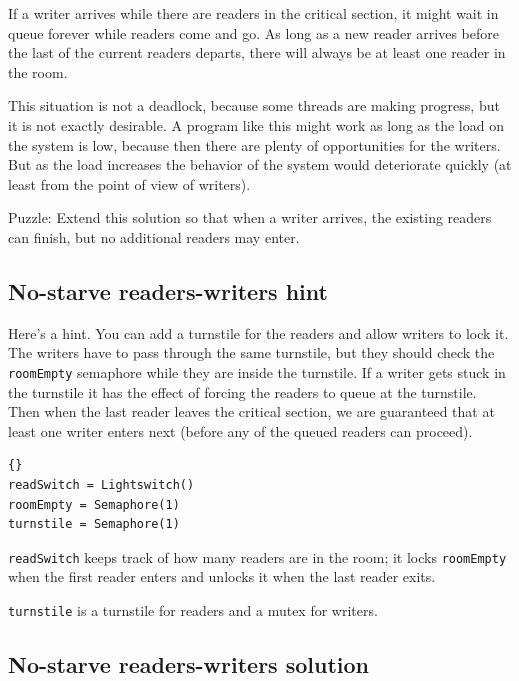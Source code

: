\documentclass{book}
\newcommand{\clearemptydoublepage}{\newpage\cleardoublepage}
\begin{document}
If a writer arrives while there are readers in the critical section,
it might wait in queue forever while readers come and go.  As long
as a new reader arrives before the last of the current readers
departs, there will always be at least one reader in the room.

This situation is not a deadlock, because some threads are making
progress, but it is not exactly desirable.  A program like this
might work as long as the load on the system is low, because then there
are plenty of opportunities for the writers.  But as the load
increases the behavior of the system would deteriorate quickly
(at least from the point of view of writers).

Puzzle: Extend this solution so that when a writer arrives,
the existing readers can finish, but no additional readers
may enter.


\clearemptydoublepage
\subsection {No-starve readers-writers hint}  

Here's a hint.  You can add a turnstile for the readers and
allow writers to lock it.  The writers have to pass through
the same turnstile, but they should check the {\tt roomEmpty}
semaphore while they are inside the turnstile.  If a writer
gets stuck in the turnstile it has the effect of forcing the
readers to queue at the turnstile.  Then when the last reader
leaves the critical section, we are guaranteed that at least
one writer enters next (before any of the queued readers can
proceed).

\begin{latin}
\begin{latin}
\begin{lstlisting}[title={No-starve readers-writers initialization}]{}
readSwitch = Lightswitch()
roomEmpty = Semaphore(1)
turnstile = Semaphore(1)
\end{lstlisting}
\end{latin}
\end{latin}

{\tt readSwitch} keeps track of how many readers are in the room;
it locks {\tt roomEmpty} when the first reader
enters and unlocks it when the last reader exits.

{\tt turnstile} is a turnstile for readers and a 
mutex for writers.


\clearemptydoublepage
\subsection {No-starve readers-writers solution}  
\end{document}
